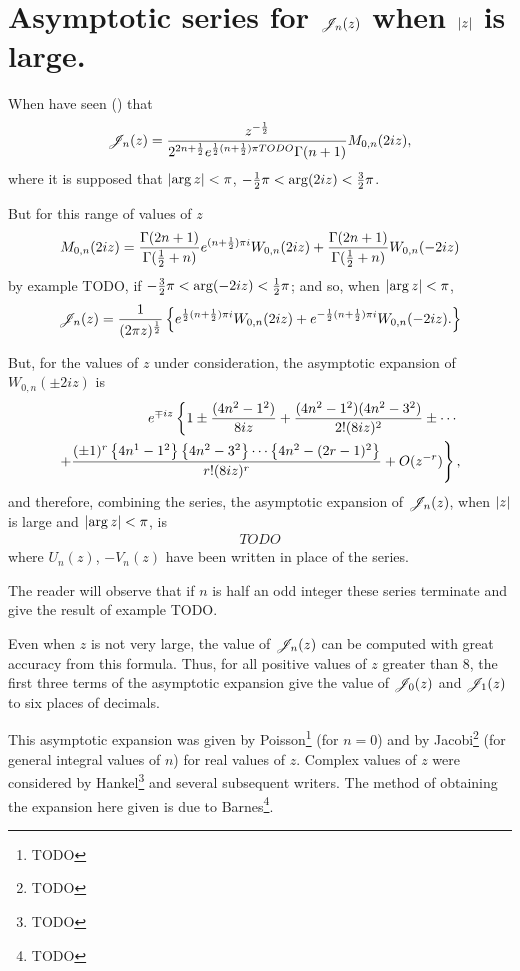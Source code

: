 \documentclass{book}
\begin{document}
\section{Asymptotic series for $\mathscr{J}_n(z)$ when $\left| z \right|$ is large.}
When have seen () that
$$
\mathscr{J}_n(z)
=
\frac{z^{-\frac{1}{2}}}{2^{2n+\frac{1}{2}} e^{\frac{1}{2}(n+\frac{1}{2})\pi TODO} \Gamma(n+1)}
M_{0,n}(2iz),
$$
where it is supposed that 
$\left|  \arg z  \right| < \pi$,
$-\frac{1}{2}\pi < \arg (2iz) < \frac{3}{2} \pi$.

But for this range of values of $z$
$$
M_{0,n}(2iz)
=
\frac{\Gamma(2n+1)}{\Gamma(\frac{1}{2} + n)}
e^{(n+\frac{1}{2})\pi i}
W_{0,n}(2iz)
+
\frac{\Gamma(2n+1)}{\Gamma(\frac{1}{2}+n)}
W_{0,n}(-2iz)
$$
by  example TODO,
if
$-\frac{3}{2} \pi < \arg (-2iz) < \frac{1}{2} \pi$; and so, when
$\left| \arg z \right| < \pi$,
$$
\mathscr{J}_n(z)
=
\frac{1}{(2\pi z)^{\frac{1}{2}}}
\left\{ 
  e^{\frac{1}{2} (n+\frac{1}{2})\pi i} W_{0,n}(2iz)
  +
  e^{-\frac{1}{2} (n+\frac{1}{2})\pi i} W_{0,n}(-2iz).
 \right\}
$$

But, for the values of $z$ under consideration, the asymptotic
expansion of $W_{0,n}(\pm 2 i z)$ is
\begin{align*}
  e^{\mp i z}
  \left\{
    1
    \pm \frac{(4n^2 - 1^2)}{8iz}
    + \frac{ (4n^2-1^2)(4n^2-3^2)}{2! (8iz)^2}
    \pm \cdots
  \right.
  \\
  \left.
    + \frac{ (\pm 1)^r \left\{ 4n^1-1^2 \right\} \left\{ 4n^2-3^2 \right\} \cdots
      \left\{ 4n^2 - (2r-1)^2 \right\}  }{r! (8iz)^r}
    + O(z^{-r})
  \right\},
\end{align*}
and therefore, combining the series, the asymptotic expansion of
$\mathscr{J}_n(z)$, when $\left| z \right|$ is large and $\left| \arg z \right| < \pi$, is
\begin{align*}
  TODO
\end{align*}
where $U_n(z)$, $-V_n(z)$ have been written in place of the series.

The reader will observe that if $n$ is half an odd integer these
series terminate and give the result of 
example TODO.

% 
% 
Even when $z$ is not very large, the value of $\mathscr{J}_n(z)$ can be
computed with great accuracy from this formula. Thus, for all
positive values of $z$ greater than $8$, the first three terms of
the asymptotic expansion give the value of $\mathscr{J}_0(z)$ and $\mathscr{J}_1(z)$ to
six places of decimals.

This asymptotic expansion was given by Poisson\footnote{TODO} (for
$n=0$) and by Jacobi\footnote{TODO} (for general integral values of
$n$) for real values of $z$.
Complex values of $z$ were considered by Hankel\footnote{TODO} and
several subsequent writers. The method of obtaining the expansion
here given is due to Barnes\footnote{TODO}.
\end{document}
